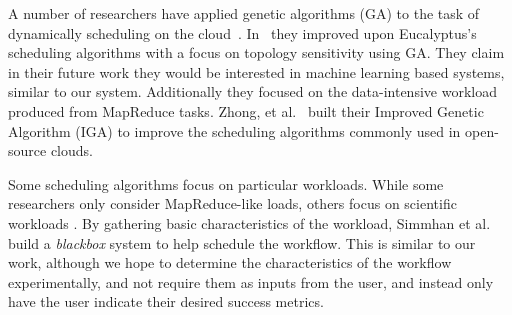 
A number of researchers have applied genetic algorithms (GA) to the task of
dynamically scheduling on the cloud~\cite{Lee,Zhong,Chenhong}.  In~\cite{Lee}
they improved upon Eucalyptus's scheduling algorithms with a focus on topology
sensitivity using GA.  They claim in their future work they would be interested
in machine learning based systems, similar to our system.  Additionally they
focused on the data-intensive workload produced from MapReduce tasks. Zhong, et
al.~\cite{Zhong} built their Improved Genetic Algorithm (IGA) to improve the
scheduling algorithms commonly used in open-source clouds.


Some scheduling algorithms focus on particular workloads.  While some
researchers only consider MapReduce-like loads, others focus on scientific
workloads \cite{Juve,Simmhan,Hoffa}.  By gathering basic characteristics of the
workload, Simmhan et al.~\cite{Simmhan} build a \emph{blackbox} system to help
schedule the workflow.  This is similar to our work, although we hope to
determine the characteristics of the workflow experimentally, and not require
them as inputs from the user, and instead only have the user indicate their
desired success metrics.
